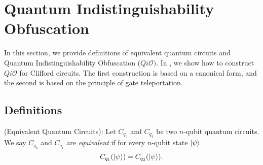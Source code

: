 
\section{Quantum Indistinguishability Obfuscation}
\label{sec:QiO-Cliffords and more}
In this section, we provide definitions of equivalent quantum circuits and  Quantum Indistinguishability Obfuscation ($Qi\mathcal{O})$. In  , we show how to construct $Qi\mathcal{O}$ for Clifford circuits. The first construction is based on a canonical form, and the second is based on the principle of gate teleportation.



\subsection{Definitions}
\label{def:equivalent-circuits}
\begin{definition} {\rm (Equivalent Quantum Circuits):}
Let $C_{q_0}$ and $C_{q_1}$ be two $n$-qubit quantum circuits. We say $C_{q_0}$ and $C_{q_1}$ are \emph{equivalent} if for every $n$-qubit state ${\lvert}\psi\rangle$
$$C_{q_1}({\lvert}\psi\rangle) =C_{q_2}({\lvert}\psi\rangle).$$
\end{definition}

